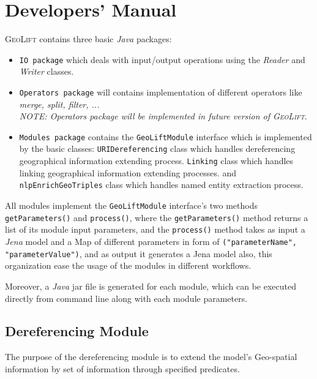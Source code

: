 \documentclass[a4paper,twoside,bibtotoc,abstracton,12pt,BCOR=15mm]{article}
\newcommand{\geolift}{\textsc{GeoLift}\xspace}
\begin{document}
\section{Developers' Manual}
\geolift contains three basic \emph{Java} packages: 
\begin{itemize}
 \item \texttt{IO package} which deals with input/output operations using the \emph{Reader} and \emph{Writer} classes.
 \item\texttt{Operators package} will contains implementation of different operators like \emph{merge, split, filter, ...} 
 \\\emph{NOTE: Operators package will be implemented in future version of \geolift}.
 \item\texttt{Modules package} contains the \texttt{GeoLiftModule} interface which is implemented by the basic classes: 
  \texttt{URIDereferencing} class which handles dereferencing  geographical information extending process. 
 \texttt{Linking} class which handles linking geographical information extending processes. 
 and \texttt{nlpEnrichGeoTriples} class which handles named entity extraction process.
\end{itemize}

 All modules implement the \texttt{GeoLiftModule} interface's two methods \texttt{getParameters()} and \texttt{process()},
 where the \texttt{getParameters()} method returns a list of its module input parameters,
 and the \texttt{process()} method takes as input a \emph{Jena} model and a Map of different parameters in form of \texttt{("parameterName", "parameterValue")},
 and as output it generates a Jena model also, this organization ease the usage of the modules in different workflows.

 Moreover, a \emph{Java} jar file is generated for each module, which can be executed directly from command line along with each module parameters.
 
\subsection{Dereferencing Module}
 The purpose of the dereferencing module is to extend the model's Geo-spatial information by set of information through specified predicates.
\end{document}

